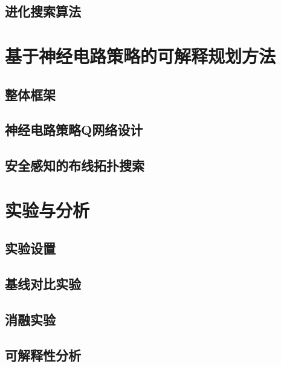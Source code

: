 \documentclass{article}
\begin{document}
        \subsection{进化搜索算法}
            

    \clearpage
    \sanhaolineskip
    \section{基于神经电路策略的可解释规划方法}
        \subsection{整体框架}
            
        \subsection{神经电路策略Q网络设计}
            
        \subsection{安全感知的布线拓扑搜索}
            

    \clearpage
    \sanhaolineskip
    \section{实验与分析}
        \subsection{实验设置}
            
        \subsection{基线对比实验}
            
        \subsection{消融实验}
            
        \subsection{可解释性分析}
            
\end{document}
